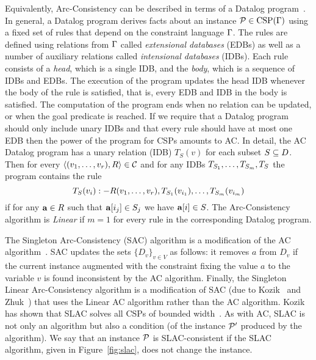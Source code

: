 \documentclass[11pt,letter]{article}
\begin{document}
Equivalently, Arc-Consistency can be described in terms of a Datalog
program~\cite{Kolaitis95:jcss}. In general, a Datalog program derives facts about an
instance ${\mathcal P}\in{\rm CSP}(\Gamma)$
using a fixed set of rules that depend on the constraint language $\Gamma$. The
rules are defined using relations from $\Gamma$ called
\emph{extensional databases} (EDBs) as well as a number of auxiliary relations
called \emph{intensional databases} (IDBs). Each rule consists of a \emph{head},
which is a single IDB, and the \emph{body}, which is a sequence of IDBs and
EDBs. The execution of the program updates the head IDB whenever the body of the
rule is satisfied, that is, every EDB and IDB in the body is satisfied. The computation of the program ends when no relation can be
updated, or when the goal predicate is reached. If we require that a Datalog
program should only include unary IDBs and that every rule should have at most one EDB
then the power of the program for CSPs amounts to AC. 
In detail, the AC Datalog program has a unary relation (IDB) $T_S(v)$ for each 
subset $S\subseteq D$. Then for every $\langle (v _1,\ldots, v _{r}),R \rangle\in{\mathcal C}$ and for any
IDBs $T_{S_1},\ldots, T_{S_m}, T_S$ the program contains the rule
\[
T_S(v_i):-R(v _1,\ldots, v _{r}),T_{S_1}(v_{i_1}),\ldots, T_{S_m}(v_{i_m})
\]
if for any ${\bf a}\in R$ such that ${\bf a}[i_j]\in S_j$ we have ${\bf a}[i]\in S$.
The Arc-Consistency algorithm is \emph{Linear} if $m=1$ for every rule in the
corresponding Datalog program. 

The Singleton Arc-Consistency (SAC) algorithm is a modification of
the AC algorithm~\cite{DB97}. SAC updates the sets $\{D_v\}_{v\in V}$
as follows: it removes $a$ from $D_v$ if the current
instance augmented with the constraint fixing the value $a$ to the variable $v$ is
found inconsistent by the AC algorithm. 
Finally, the Singleton Linear Arc-Consistency algorithm is a modification of SAC
(due to Kozik~\cite{Kozik21:sicomp} and Zhuk~\cite{Zhuk20:jacm}) that uses the
Linear AC algorithm rather than the AC algorithm. Kozik has shown that SLAC
solves all CSPs of bounded width~\cite{Kozik21:sicomp}.
As with AC, SLAC is not only an algorithm but also a condition (of the instance
${\mathcal P}'$ produced by the algorithm). We say that an instance
${\mathcal P}$ is SLAC-consistent if the SLAC algorithm, given in Figure~\ref{fig:slac},
does not change the instance.
\end{document}
